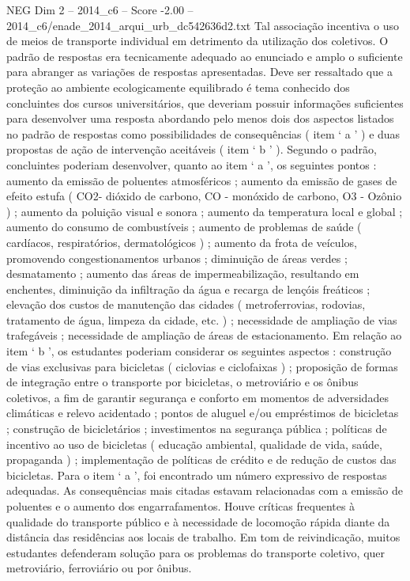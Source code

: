 \begin{textsample}{NEG Dim 2 – 2014\_c6 – Score -2.00 – 2014\_c6/enade\_2014\_arqui\_urb\_dc542636d2.txt}
Tal associação incentiva o uso de meios de transporte individual em detrimento da utilização dos coletivos.
O padrão de respostas era tecnicamente adequado ao enunciado e amplo o suficiente para abranger as variações de respostas apresentadas.
Deve ser ressaltado que a proteção ao ambiente ecologicamente equilibrado é tema conhecido dos concluintes dos cursos universitários, que deveriam possuir informações suficientes para desenvolver uma resposta abordando pelo menos dois dos aspectos listados no padrão de respostas como possibilidades de consequências ( item ‘ a ’ ) e duas propostas de ação de intervenção aceitáveis ( item ‘ b ’ ).
Segundo o padrão, concluintes poderiam desenvolver, quanto ao item ‘ a ’, os seguintes pontos : aumento da emissão de poluentes atmosféricos ; aumento da emissão de gases de efeito estufa ( CO2- dióxido de carbono, CO - monóxido de carbono, O3 - Ozônio ) ; aumento da poluição visual e sonora ; aumento da temperatura local e global ; aumento do consumo de combustíveis ; aumento de problemas de saúde ( cardíacos, respiratórios, dermatológicos ) ; aumento da frota de veículos, promovendo congestionamentos urbanos ; diminuição de áreas verdes ; desmatamento ; aumento das áreas de impermeabilização, resultando em enchentes, diminuição da infiltração da água e recarga de lençóis freáticos ; elevação dos custos de manutenção das cidades ( metroferrovias, rodovias, tratamento de água, limpeza da cidade, etc. ) ; necessidade de ampliação de vias trafegáveis ; necessidade de ampliação de áreas de estacionamento.
Em relação ao item ‘ b ’, os estudantes poderiam considerar os seguintes aspectos : construção de vias exclusivas para bicicletas ( ciclovias e ciclofaixas ) ; proposição de formas de integração entre o transporte por bicicletas, o metroviário e os ônibus coletivos, a fim de garantir segurança e conforto em momentos de adversidades climáticas e relevo acidentado ; pontos de aluguel e/ou empréstimos de bicicletas ; construção de bicicletários ; investimentos na segurança pública ; políticas de incentivo ao uso de bicicletas ( educação ambiental, qualidade de vida, saúde, propaganda ) ; implementação de políticas de crédito e de redução de custos das bicicletas.
Para o item ‘ a ’, foi encontrado um número expressivo de respostas adequadas.
As consequências mais citadas estavam relacionadas com a emissão de poluentes e o aumento dos engarrafamentos.
Houve críticas frequentes à qualidade do transporte público e à necessidade de locomoção rápida diante da distância das residências aos locais de trabalho.
Em tom de reivindicação, muitos estudantes defenderam solução para os problemas do transporte coletivo, quer metroviário, ferroviário ou por ônibus.

\end{textsample}

